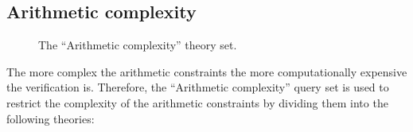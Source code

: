\subsection{Arithmetic complexity}
\label{sec:arithmetic-complexity}

\begin{figure}[h]
\centering
{}
\caption{The ``Arithmetic complexity'' theory set.}
\label{fig:arithmetic-complexities}
\end{figure}

The more complex the arithmetic constraints the more computationally expensive the verification is. Therefore, the ``Arithmetic complexity'' query set is used to restrict the complexity of the arithmetic constraints by dividing them into the following theories:


